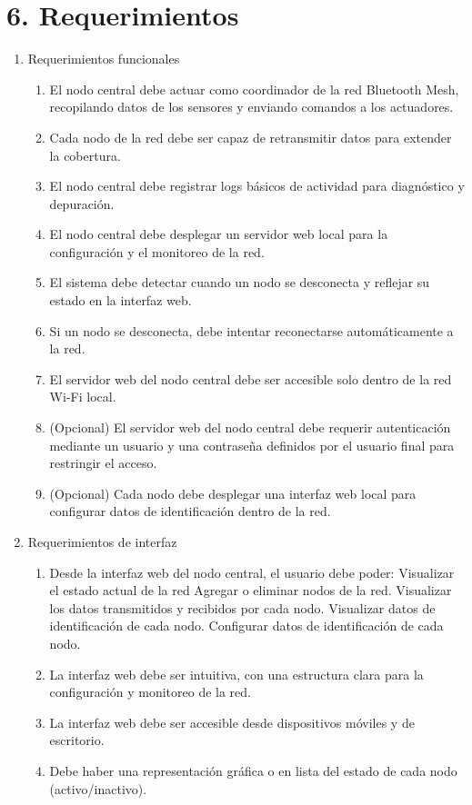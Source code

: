 \documentclass[
11pt, %
]{charter}
\begin{document}
\section{6. Requerimientos}
\label{sec:requerimientos}

\begin{enumerate}
\item Requerimientos funcionales
	\begin{enumerate}
		\item El nodo central debe actuar como coordinador de la red Bluetooth Mesh, recopilando datos de los sensores y enviando comandos a los actuadores.
		\item Cada nodo de la red debe ser capaz de retransmitir datos para extender la cobertura.
		\item El nodo central debe registrar logs básicos de actividad para diagnóstico y depuración.
		\item El nodo central debe desplegar un servidor web local para la configuración y el monitoreo de la red.
		\item El sistema debe detectar cuando un nodo se desconecta y reflejar su estado en la interfaz web.
		\item Si un nodo se desconecta, debe intentar reconectarse automáticamente a la red.
		\item El servidor web del nodo central debe ser accesible solo dentro de la red Wi-Fi local.
		\item (Opcional) El servidor web del nodo central debe requerir autenticación mediante un usuario y una contraseña definidos por el usuario final para restringir el acceso.	
		\item (Opcional) Cada nodo debe desplegar una interfaz web local para configurar datos de identificación dentro de la red. 
	\end{enumerate}

\item Requerimientos de interfaz
	\begin{enumerate}
		\item Desde la interfaz web del nodo central, el usuario debe poder:
		\subitem Visualizar el estado actual de la red
		\subitem Agregar o eliminar nodos de la red.
		\subitem Visualizar los datos transmitidos y recibidos por cada nodo.
		\subitem Visualizar datos de identificación de cada nodo.
		\subitem Configurar datos de identificación de cada nodo.
		\item La interfaz web debe ser intuitiva, con una estructura clara para la configuración y monitoreo de la red.
		\item La interfaz web debe ser accesible desde dispositivos móviles y de escritorio.
		\item Debe haber una representación gráfica o en lista del estado de cada nodo (activo/inactivo).


\end{enumerate}
\end{enumerate}
\end{document}
